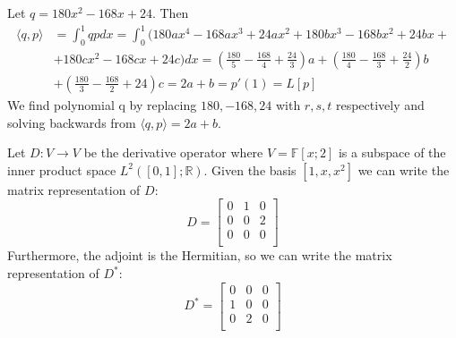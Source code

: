 \documentclass[12pt]{article}
\newcommand{\R}{\mathbb{R}}
\newcommand{\F}{\mathbb{F}}
\newenvironment{problem}[2][Problem]{\begin{trivlist}
\item[\hskip \labelsep {\bfseries #1}\hskip \labelsep {\bfseries #2}]}{\end{trivlist}}
\begin{document}
\begin{problem}{37.} 
Let $q=180x^2 -168x+24$. Then
\begin{equation*}
\begin{aligned}
 \langle q,p \rangle &= \int_0^1 qpdx = \int_0^1 (180ax^4 - 168ax^3 + 24ax^2 + 180bx^3 -168bx^2   + 24bx +\\
 & +  180cx^2 - 168cx + 24c)dx = (\frac{180}{5} - \frac{168}{4} + \frac{24}{3})a + (\frac{180}{4} - \frac{168}{3} + \frac{24}{2})b \\
 &+ (\frac{180}{3} - \frac{168}{2} +24)c =  2a + b = p'(1) = L[p]
 \end{aligned}
 \end{equation*}
 We find polynomial q by replacing $180, -168, 24$ with $r,s,t$ respectively and solving backwards from $\langle q,p \rangle = 2a + b$. 
\end{problem}

\begin{problem}{38.} 
Let $D: V \to V$ be the derivative operator where $V  = \F[x;2]$ is a subspace of the inner product space $L^2([0,1]; \R)$. Given the basis $[1,x,x^2]$ we can write the matrix representation of $D$:
\[
   D=
  \left[ {\begin{array}{ccc}
   0 & 1 & 0\\
   0 & 0 & 2\\
   0 & 0 & 0\\
  \end{array} } \right]
\]
Furthermore, the adjoint is the Hermitian, so we can write the matrix representation of $D^*$:
\[
   D^* =
  \left[ {\begin{array}{ccc}
   0 & 0 & 0\\
   1 & 0 & 0\\
   0 & 2 & 0\\
  \end{array} } \right]
\] 

\end{problem}
\end{document}
